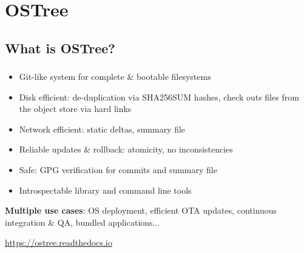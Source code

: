 %
%
%

\section{OSTree}
\subsection{What is OSTree?}

\begin{frame}
  \frametitle{\insertsubsection}

  \begin{itemize}
  \item Git-like system for complete \& bootable filesystems\vspacing
  \item Disk efficient: de-duplication via SHA256SUM hashes, check outs files from the object store via hard links\vspacing
  \item Network efficient: static deltas, summary file\vspacing
  \item Reliable updates \& rollback: atomicity, no inconsistencies\vspacing
  \item Safe: GPG verification for commits and summary file\vspacing
  \item Introspectable library and command line tools
  \end{itemize}

  \begin{flushleft}
    \textbf{Multiple use cases}: OS deployment, efficient OTA updates, continuous integration \& QA, bundled applications...
  \end{flushleft}

  \begin{center}
    \url{https://ostree.readthedocs.io}
  \end{center}
\end{frame}

